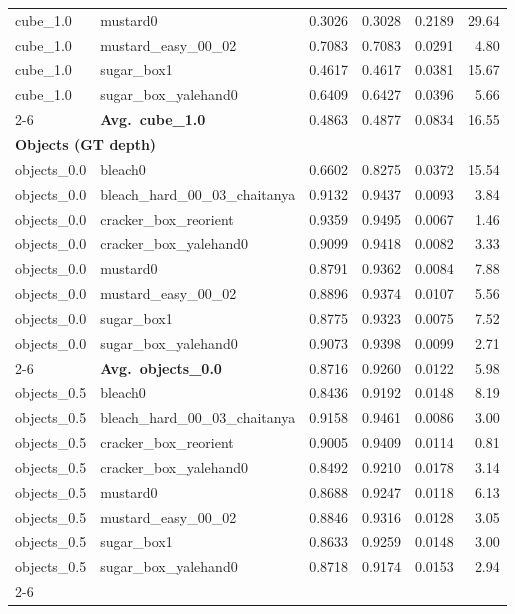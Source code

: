 \begin{longtable}{llrrrr}
  cube_1.0 & mustard0 & 0.3026 & 0.3028 & 0.2189 & 29.64 \\
  cube_1.0 & mustard\_easy\_00\_02 & 0.7083 & 0.7083 & 0.0291 & 4.80 \\
  cube_1.0 & sugar\_box1 & 0.4617 & 0.4617 & 0.0381 & 15.67 \\
  cube_1.0 & sugar\_box\_yalehand0 & 0.6409 & 0.6427 & 0.0396 & 5.66 \\
  \cmidrule{2-6}
  & \textbf{Avg.~cube_1.0} & 0.4863 & 0.4877 & 0.0834 & 16.55 \\
  \midrule
\multicolumn{6}{l}{\textbf{Objects (GT depth)}} \\
\midrule
  objects_0.0 & bleach0 & 0.6602 & 0.8275 & 0.0372 & 15.54 \\
  objects_0.0 & bleach\_hard\_00\_03\_chaitanya & 0.9132 & 0.9437 & 0.0093 & 3.84 \\
  objects_0.0 & cracker\_box\_reorient & 0.9359 & 0.9495 & 0.0067 & 1.46 \\
  objects_0.0 & cracker\_box\_yalehand0 & 0.9099 & 0.9418 & 0.0082 & 3.33 \\
  objects_0.0 & mustard0 & 0.8791 & 0.9362 & 0.0084 & 7.88 \\
  objects_0.0 & mustard\_easy\_00\_02 & 0.8896 & 0.9374 & 0.0107 & 5.56 \\
  objects_0.0 & sugar\_box1 & 0.8775 & 0.9323 & 0.0075 & 7.52 \\
  objects_0.0 & sugar\_box\_yalehand0 & 0.9073 & 0.9398 & 0.0099 & 2.71 \\
  \cmidrule{2-6}
  & \textbf{Avg.~objects_0.0} & 0.8716 & 0.9260 & 0.0122 & 5.98 \\
  \midrule
  objects_0.5 & bleach0 & 0.8436 & 0.9192 & 0.0148 & 8.19 \\
  objects_0.5 & bleach\_hard\_00\_03\_chaitanya & 0.9158 & 0.9461 & 0.0086 & 3.00 \\
  objects_0.5 & cracker\_box\_reorient & 0.9005 & 0.9409 & 0.0114 & 0.81 \\
  objects_0.5 & cracker\_box\_yalehand0 & 0.8492 & 0.9210 & 0.0178 & 3.14 \\
  objects_0.5 & mustard0 & 0.8688 & 0.9247 & 0.0118 & 6.13 \\
  objects_0.5 & mustard\_easy\_00\_02 & 0.8846 & 0.9316 & 0.0128 & 3.05 \\
  objects_0.5 & sugar\_box1 & 0.8633 & 0.9259 & 0.0148 & 3.00 \\
  objects_0.5 & sugar\_box\_yalehand0 & 0.8718 & 0.9174 & 0.0153 & 2.94 \\
  \cmidrule{2-6}

\end{longtable}
